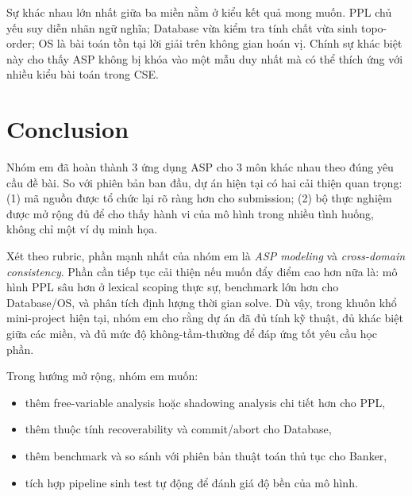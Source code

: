 ﻿\documentclass[11pt,a4paper]{article}
\begin{document}
Sự khác nhau lớn nhất giữa ba miền nằm ở kiểu kết quả mong muốn. PPL chủ yếu suy diễn nhãn ngữ nghĩa; Database vừa kiểm tra tính chất vừa sinh topo-order; OS là bài toán tồn tại lời giải trên không gian hoán vị. Chính sự khác biệt này cho thấy ASP không bị khóa vào một mẫu duy nhất mà có thể thích ứng với nhiều kiểu bài toán trong CSE.

\section{Conclusion}
Nhóm em đã hoàn thành 3 ứng dụng ASP cho 3 môn khác nhau theo đúng yêu cầu đề bài. So với phiên bản ban đầu, dự án hiện tại có hai cải thiện quan trọng: (1) mã nguồn được tổ chức lại rõ ràng hơn cho submission; (2) bộ thực nghiệm được mở rộng đủ để cho thấy hành vi của mô hình trong nhiều tình huống, không chỉ một ví dụ minh họa.

Xét theo rubric, phần mạnh nhất của nhóm em là \textit{ASP modeling} và \textit{cross-domain consistency}. Phần cần tiếp tục cải thiện nếu muốn đẩy điểm cao hơn nữa là: mô hình PPL sâu hơn ở lexical scoping thực sự, benchmark lớn hơn cho Database/OS, và phân tích định lượng thời gian solve. Dù vậy, trong khuôn khổ mini-project hiện tại, nhóm em cho rằng dự án đã đủ tính kỹ thuật, đủ khác biệt giữa các miền, và đủ mức độ không-tầm-thường để đáp ứng tốt yêu cầu học phần.

Trong hướng mở rộng, nhóm em muốn:
\begin{itemize}[leftmargin=1.5em]
  \item thêm free-variable analysis hoặc shadowing analysis chi tiết hơn cho PPL,
  \item thêm thuộc tính recoverability và commit/abort cho Database,
  \item thêm benchmark và so sánh với phiên bản thuật toán thủ tục cho Banker,
  \item tích hợp pipeline sinh test tự động để đánh giá độ bền của mô hình.
\end{itemize}
\end{document}
